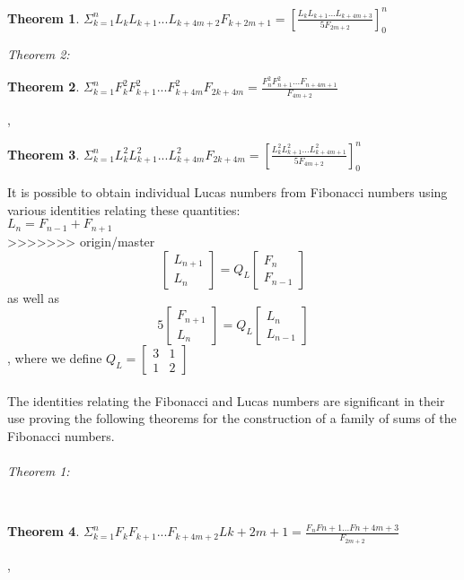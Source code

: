 \documentclass[11pt]{article}
\newtheorem{theorem}{Theorem}
\begin{document}
\begin{theorem}
$\Sigma_{k=1}^{n} L_{k}L_{k+1}...L_{k+4m+2}F_{k+2m+1}=[\frac{L_{k}L_{k+1}...L_{k+4m+3}}{5F_{2m+2}}]_{0}^n$
\end{theorem}

\textit{Theorem 2:}

\begin{theorem}
$\Sigma_{k=1}^n F_{k}^2F_{k+1}^2...F_{k+4m}^2F_{2k+4m}=\frac{F_{n}^2F_{n+1}^2...F_{n+4m+1}}{F_{4m+2}}$
\end{theorem},\\

\begin{theorem}
$\Sigma_{k=1}^n L_{k}^2L_{k+1}^2...L_{k+4m}^2F_{2k+4m}=[\frac{L_{k}^2L_{k+1}^2...L_{k+4m+1}^2}{5F_{4m+2}}]_{0}^n$
\end{theorem} It is possible to obtain individual Lucas numbers from Fibonacci numbers using various identities relating these quantities:\\$L_{n} = F_{n-1} + F_{n+1}$ \\ 
>>>>>>> origin/master
\[
\begin{bmatrix}
L_{n+1} \\
L_{n}
\end{bmatrix} = Q_{L} \begin{bmatrix} F_{n} \\ F_{n-1}\end{bmatrix}
\] 
as well as \\
\[
5\begin{bmatrix}
F_{n+1} \\
L_{n}
\end{bmatrix} = Q_{L} \begin{bmatrix} L_{n} \\ L_{n-1}\end{bmatrix}
\] , where we define $Q_{L} = \begin{bmatrix} 3 & 1 \\ 1 & 2 \end{bmatrix}$
\\
\\
The identities relating the Fibonacci and Lucas numbers are significant in their use proving the following theorems for the construction of a family of sums of the Fibonacci numbers.\\ \\
\textit{Theorem 1:}  

\\\begin{theorem}
$\Sigma_{k=1}^{n} F_{k}F_{k+1}...F_{k+4m+2}L{k+2m+1} = \frac{F_{n}F{n+1}...F{n+4m+3}}{F_{2m+2}}$
\end{theorem},\\
\end{document}

